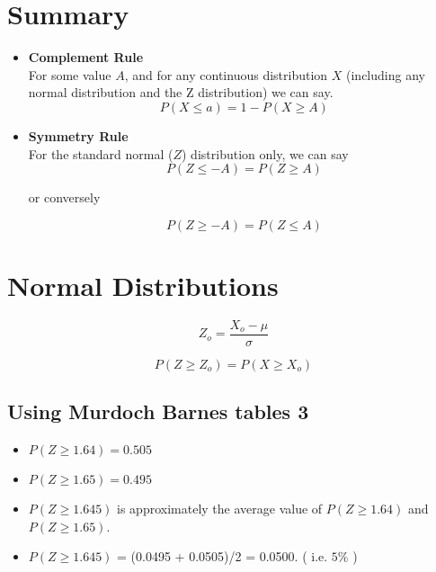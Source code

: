 \documentclass[]{report}
\begin{document}


\section{Summary}

\begin{itemize}

\item \textbf{Complement Rule}\\
For some value $A$, and for any continuous distribution $X$ (including any normal distribution and the Z distribution) we can say.
\[ P(X \leq a) = 1 - P(X \geq A) \]

\item \textbf{Symmetry Rule}\\
For the standard normal ($Z$) distribution only, we can say
\[ P(Z \leq -A) = P(Z \geq A) \]

or conversely

\[ P(Z \geq -A) = P(Z \leq A) \]

\end{itemize}




\section{Normal Distributions}
\begin{equation}
Z_{o}= \frac{ X_{o}-\mu }{\sigma}
\end{equation}

\begin{equation}
P(Z \geq Z_{o}) = P(X \geq X_{o})
\end{equation}

{
\subsection{Using Murdoch Barnes tables 3}
\begin{itemize}
\item $ P(Z \geq 1.64) = 0.505$
\item $ P(Z \geq 1.65) = 0.495$ \bigskip
\item $ P(Z \geq 1.645)$ is approximately the average value of $ P(Z \geq 1.64)$ and $ P(Z \geq 1.65)$.
\item $ P(Z \geq 1.645)$ = (0.0495 + 0.0505)/2 = 0.0500. ( i.e. $5\%$ )
\end{itemize}
}
\end{document}
